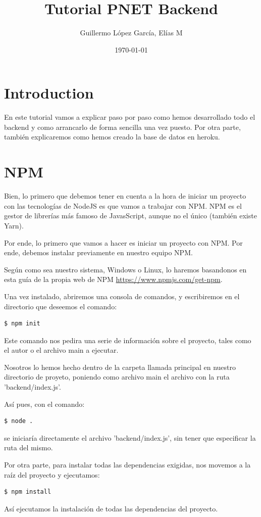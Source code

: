 \documentclass{article}
\title{Tutorial PNET Backend}
\author{Guillermo López García, Elías M}
\date{\today}
\begin{document}
\maketitle

\tableofcontents

\section{Introduction}
En este tutorial vamos a explicar paso por paso como hemos desarrollado todo el backend y como arrancarlo de forma sencilla una vez puesto.
Por otra parte, también explicaremos como hemos creado la base de datos en heroku.

\section{NPM}
Bien, lo primero que debemos tener en cuenta a la hora de iniciar un proyecto con las tecnologías de NodeJS es que vamos a trabajar con NPM. NPM es el gestor de librerías más famoso de JavasScript, aunque no el único (también existe Yarn).

Por ende, lo primero que vamos a hacer es iniciar un proyecto con NPM. Por ende, debemos instalar previamente en nuestro equipo NPM.

Según como sea nuestro sistema, Windows o Linux, lo haremos basandonos en esta guía de la propia web de NPM \url{https://www.npmjs.com/get-npm}.

Una vez instalado, abriremos una consola de comandos, y escribiremos en el directorio que deseemos el comando:
\begin{lstlisting}[language=bash]
  $ npm init
\end{lstlisting}

Este comando nos pedira una serie de información sobre el proyecto, tales como el autor o el archivo main a ejecutar.

Nosotros lo hemos hecho dentro de la carpeta llamada principal en nuestro directorio de proyeto, poniendo como archivo main el archivo con la ruta 'backend/index.js'.

Así pues, con el comando:
\begin{lstlisting}[language=bash]
  $ node .
\end{lstlisting}
se iniciaría directamente el archivo 'backend/index.js', sin tener que especificar la ruta del mismo.

Por otra parte, para instalar todas las dependencias exigidas, nos movemos a la raíz del proyecto y ejecutamos: 
\begin{lstlisting}[language=bash]
  $ npm install
\end{lstlisting}
Así ejecutamos la instalación de todas las dependencias del proyecto.
\end{document}
